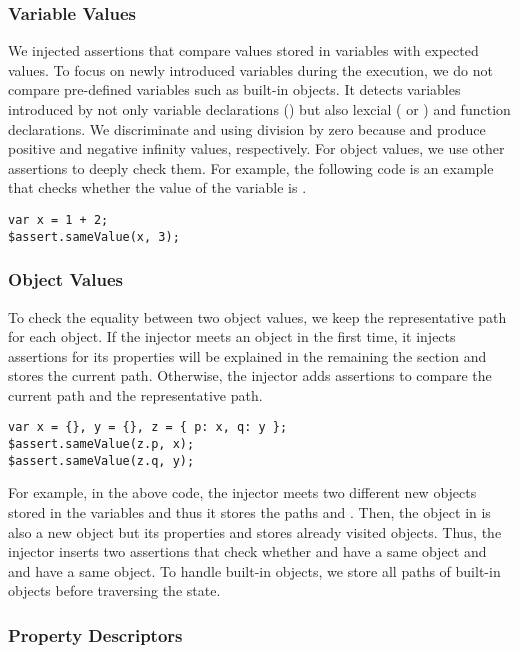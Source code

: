 \subsubsection{Variable Values}

We injected assertions that compare values stored in variables with expected
values.  To focus on newly introduced variables during the execution, we do not
compare pre-defined variables such as built-in objects.  It detects variables
introduced by not only variable declarations () but also lexcial
( or ) and function declarations.  We discriminate
 and  using division by zero because  and
 produce positive and negative infinity values, respectively.  For
object values, we use other assertions to deeply check them.  For example, the
following code is an example that checks whether the value of the variable
 is .
\begin{lstlisting}[style=myJSstyle]
var x = 1 + 2;
$assert.sameValue(x, 3);
\end{lstlisting}


\subsubsection{Object Values}

To check the equality between two object values, we keep the representative path
for each object.  If the injector meets an object in the first time, it injects
assertions for its properties will be explained in the remaining the section and
stores the current path.  Otherwise, the injector adds assertions to compare the
current path and the representative path.
\begin{lstlisting}[style=myJSstyle]
var x = {}, y = {}, z = { p: x, q: y };
$assert.sameValue(z.p, x);
$assert.sameValue(z.q, y);
\end{lstlisting}
For example, in the above code, the injector meets two different new objects
stored in the variables  and  thus it stores the paths 
and .  Then, the object in  is also a new object but its
properties  and  stores already visited objects.  Thus, the
injector inserts two assertions that check whether  and  have
a same object and  and  have a same object.  To handle
built-in objects, we store all paths of built-in objects before traversing the
state.


\subsubsection{Property Descriptors}

